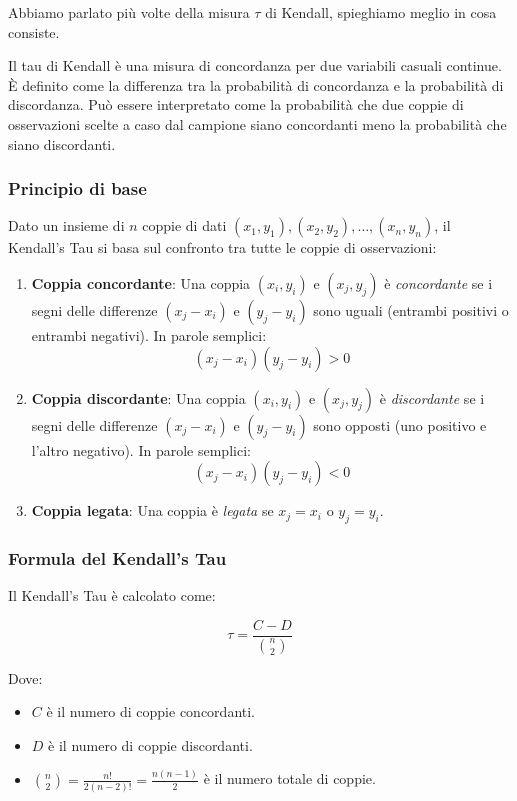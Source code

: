 \documentclass[%
	corpo=11pt,
    twoside,
    stile=classica,
    oldstyle,
    tipotesi=custom,
    greek,
    evenboxes,
]{toptesi}
\begin{document}
Abbiamo parlato più volte della misura \( \tau \) di Kendall, spieghiamo meglio in cosa consiste.

Il tau di Kendall è una misura di concordanza per due variabili casuali continue. È definito come la differenza tra la probabilità di concordanza e la probabilità di discordanza. Può essere interpretato come la probabilità che due coppie di osservazioni scelte a caso dal campione siano concordanti meno la probabilità che siano discordanti.

\subsubsection{Principio di base}

Dato un insieme di \( n \) coppie di dati \( (x_1, y_1), (x_2, y_2), \dots, (x_n, y_n) \), il Kendall’s Tau si basa sul confronto tra tutte le coppie di osservazioni:

\begin{enumerate}
	\item \textbf{Coppia concordante}: Una coppia \( (x_i, y_i) \) e \( (x_j, y_j) \) è \textit{concordante} se i segni delle differenze \( (x_j - x_i) \) e \( (y_j - y_i) \) sono uguali (entrambi positivi o entrambi negativi). In parole semplici:
	\[
	(x_j - x_i)(y_j - y_i) > 0
	\]
	
	\item \textbf{Coppia discordante}: Una coppia \( (x_i, y_i) \) e \( (x_j, y_j) \) è \textit{discordante} se i segni delle differenze \( (x_j - x_i) \) e \( (y_j - y_i) \) sono opposti (uno positivo e l’altro negativo). In parole semplici:
	\[
	(x_j - x_i)(y_j - y_i) < 0
	\]
	
	\item \textbf{Coppia legata}: Una coppia è \textit{legata} se \( x_j = x_i \) o \( y_j = y_i \).
\end{enumerate}

\subsubsection{Formula del Kendall’s Tau}

Il Kendall’s Tau è calcolato come:

\[
\tau = \frac{C - D}{\binom{n}{2}}
\]

Dove:
\begin{itemize}
	\item \( C \) è il numero di coppie concordanti.
	\item \( D \) è il numero di coppie discordanti.
	\item \( \binom{n}{2} = \frac{n!}{2(n-2)!} = \frac{n(n-1)}{2} \) è il numero totale di coppie.
\end{itemize}
\end{document}
